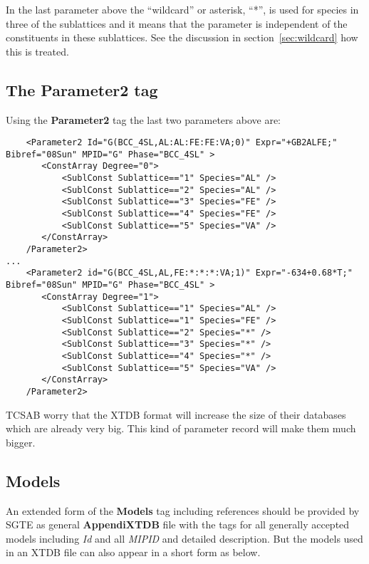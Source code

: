 \documentclass{article}
\begin{document}
\begin{appendices}
In the last parameter above the ``wildcard'' or asterisk, ``*'', is
used for species in three of the sublattices and it means that the
parameter is independent of the constituents in these sublattices.
See the discussion in section~\ref{sec:wildcard} how this is treated.


\subsection{The Parameter2 tag}

Using the {\bf Parameter2} tag the last two parameters above are:

{\small
\begin{verbatim}
    <Parameter2 Id="G(BCC_4SL,AL:AL:FE:FE:VA;0)" Expr="+GB2ALFE;" Bibref="08Sun" MPID="G" Phase="BCC_4SL" >
       <ConstArray Degree="0">
           <SublConst Sublattice=="1" Species="AL" />
           <SublConst Sublattice=="2" Species="AL" />
           <SublConst Sublattice=="3" Species="FE" />
           <SublConst Sublattice=="4" Species="FE" />
           <SublConst Sublattice=="5" Species="VA" />
       </ConstArray>
    /Parameter2>
...
    <Parameter2 id="G(BCC_4SL,AL,FE:*:*:*:VA;1)" Expr="-634+0.68*T;" Bibref="08Sun" MPID="G" Phase="BCC_4SL" >
       <ConstArray Degree="1">
           <SublConst Sublattice=="1" Species="AL" />
           <SublConst Sublattice=="1" Species="FE" />
           <SublConst Sublattice=="2" Species="*" />
           <SublConst Sublattice=="3" Species="*" />
           <SublConst Sublattice=="4" Species="*" />
           <SublConst Sublattice=="5" Species="VA" />
       </ConstArray>
    /Parameter2>
\end{verbatim}
}

TCSAB worry that the XTDB format will increase the size of their
databases which are already very big.  This kind of parameter record
will make them much bigger.

\newpage 

\subsection{Models}\label{sec:modelex}

An extended form of the {\bf Models} tag including references should
be provided by SGTE as general {\bf AppendiXTDB} file with the tags
for all generally accepted models including {\em Id} and all {\em
  MIPID} and detailed description.  But the models used in an XTDB
file can also appear in a short form as below.


\end{appendices}
\end{document}
